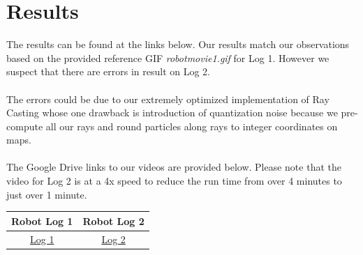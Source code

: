 \documentclass[12pt, a4paper]{article}
\begin{document}
\section{Results}
The results can be found at the links below. Our results match our observations based on the provided reference GIF \textit{robotmovie1.gif} for Log 1. However we suspect that there are errors in result on Log 2.\\\\
The errors could be due to our extremely optimized implementation of Ray Casting whose one drawback is introduction of quantization noise because we pre-compute all our rays and round particles along rays to integer coordinates on maps.\\\\
The Google Drive links to our videos are provided below. Please note that the video for Log 2 is at a 4x speed to reduce the run time from over 4 minutes to just over 1 minute.
\begin{center}
\begin{tabular}{||c | c||} 
  \hline
  Robot Log 1 & Robot Log 2 \\
  \hline
  \href{https://drive.google.com/file/d/1qt8UM7HHN9xPAYrRJYI5JoRR8iQb3wQ5/view?usp=sharing}{Log 1} & \href{https://drive.google.com/file/d/1-rfNtqJuf1p7kxYXcXjpizGDpsq9AJ4A/view?usp=sharing}{Log 2} \\
  \hline
\end{tabular}
\end{center}
\end{document}
